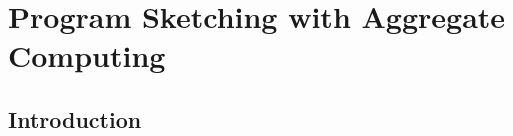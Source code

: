 

\lstset{language=scafi}


\newcommand{\export}{export}
\newcommand{\round}{round}
\newcommand{\RS}{\mathcal{S}}
\newcommand{\RA}{\mathcal{A}}
\newcommand{\RP}{\mathcal{P}}
\newcommand{\RR}{\mathcal{R}}
\newcommand{\RE}{\mathbb{E}}


\newenvironment{iequation}{\(}{\). }



\sloppypar


\chapter{Program Sketching with Aggregate Computing}

\section{Introduction}


